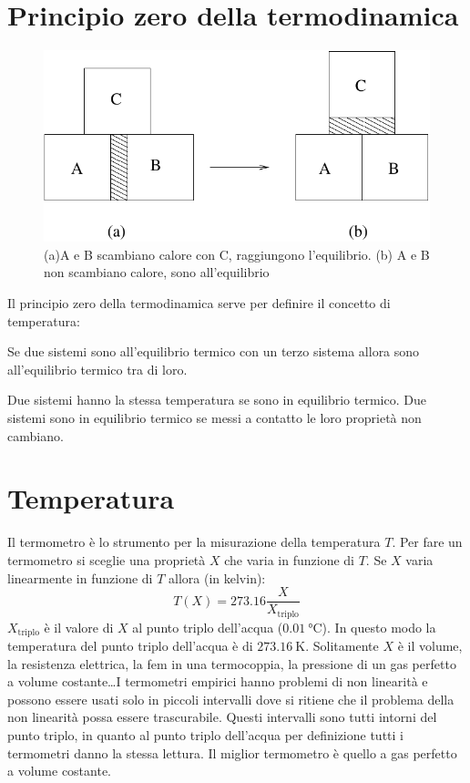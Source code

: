\section{Principio zero della termodinamica}
\begin{figure}[htbp]
\centering
\includegraphics[scale=0.5]{immagini/fisica1/principio_zero}
\caption{(a)A e B scambiano calore con C, raggiungono l'equilibrio. (b) A e B non scambiano calore, sono all'equilibrio}
\end{figure}
Il principio zero della termodinamica serve per definire il concetto di temperatura:
\begin{Pri}
Se due sistemi sono all'equilibrio termico con un terzo sistema allora sono all'equilibrio termico tra di loro.

Due sistemi hanno la stessa temperatura se sono in equilibrio termico. Due sistemi sono in equilibrio termico se messi a contatto le loro proprietà non cambiano.
\end{Pri}

\section{Temperatura}
Il termometro è lo strumento per la misurazione della temperatura $T$. Per fare un termometro si sceglie una proprietà $X$ che varia in funzione di $T$. Se $X$ varia linearmente in funzione di $T$ allora (in kelvin):
\begin{equation}
T(X)=273.16\frac{X}{X_\text{triplo}}
\end{equation}
$X_\text{triplo}$ è il valore di $X$ al punto triplo dell'acqua ($\SI{0.01}{\celsius}$). In questo modo la temperatura del punto triplo dell'acqua è di $\SI{273.16}{\kelvin}$. Solitamente $X$ è il volume, la resistenza elettrica, la fem in una termocoppia, la pressione di un gas perfetto a volume costante\ldots I termometri empirici hanno problemi di non linearità e possono essere usati solo in piccoli intervalli dove si ritiene che il problema della non linearità possa essere trascurabile. Questi intervalli sono tutti intorni del punto triplo, in quanto al punto triplo dell'acqua per definizione tutti i termometri danno la stessa lettura. Il miglior termometro è quello a gas perfetto a volume costante.

